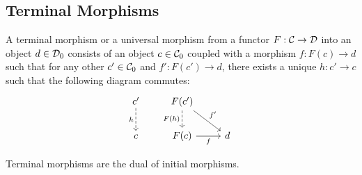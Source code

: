 \subsection{Terminal Morphisms}

\begin{definition}
	A terminal morphism or a universal morphism from a functor $F: \mathcal{C} \to \mathcal{D}$ into
	an object $d\in \mathcal{D}_0$ consists of an object $c\in \mathcal{C}_0$ coupled with a
	morphism $f: F(c) \to d$ such that for any other $c'\in \mathcal{C}_0$ and $f': F(c')
	\to d$, there exists a unique $h:c' \to c$ such that the following diagram
	commutes:
	\[\begin{tikzcd}[ampersand replacement=\&]
		{c'} \& {F(c')} \\
		c \& {F(c)} \& d
		\arrow["{F(h)}"', dashed, from=1-2, to=2-2]
		\arrow["{f'}", from=1-2, to=2-3]
		\arrow["f"', from=2-2, to=2-3]
		\arrow["h"', dashed, from=1-1, to=2-1]
	\end{tikzcd}\]
\end{definition}

\begin{remark}
	Terminal morphisms are the dual of initial morphisms.
\end{remark}

